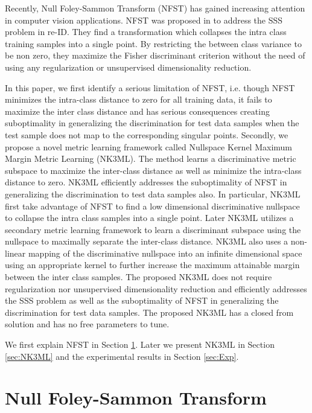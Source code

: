 \documentclass[runningheads]{llncs}
\begin{document}
Recently, Null Foley-Sammon Transform (NFST)\cite{Zheng:nfst,bodesheim:novelty,guo:nfst} has gained increasing attention in computer vision applications. NFST was proposed in \cite{Zheng:nfst} to address the SSS problem in re-ID. They find a transformation which collapses the intra class training samples into a single point. By restricting the between class variance to be non zero, they maximize the Fisher discriminant criterion without the need of using any regularization or unsupervised dimensionality reduction.

In this paper, we first identify a serious limitation of NFST, i.e. though NFST minimizes the intra-class distance to zero for all training data, it fails to maximize the inter class distance and has serious consequences creating suboptimality in generalizing the discrimination for test data samples when the test sample does not map to the corresponding singular points. Secondly, we propose a novel \color{black}metric learning framework called Nullspace Kernel Maximum Margin Metric Learning (NK3ML). The method learns a discriminative metric subspace to maximize the inter-class distance as well as minimize the intra-class distance to zero. NK3ML efficiently addresses the suboptimality of NFST in generalizing the discrimination to test data samples also. In particular, NK3ML first take advantage of NFST to find a low dimensional discriminative nullspace to collapse the intra class samples into a single point. Later NK3ML utilizes a secondary metric learning framework
to learn a discriminant subspace using the nullspace to maximally separate the inter-class distance.
NK3ML also uses a non-linear mapping of the discriminative nullspace into an infinite dimensional space using an appropriate kernel to further increase the maximum attainable margin between the inter class samples. The proposed NK3ML does not require regularization nor unsupervised dimensionality reduction and efficiently addresses the SSS problem as well as the suboptimality of NFST in generalizing the discrimination for test data samples. The proposed NK3ML has a closed from solution and has no free parameters to tune.

We first explain NFST in Section \ref{sec:NFST}. Later we present NK3ML in Section \ref{sec:NK3ML} and the experimental results in Section \ref{sec:Exp}.

\section{Null Foley-Sammon Transform}
\label{sec:NFST}
\end{document}
